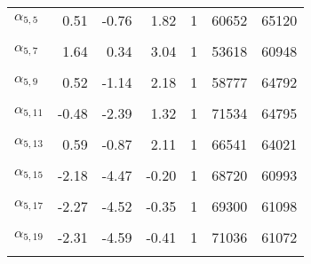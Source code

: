 \begin{longtable}[t]{lrrrrrr}
$\alpha_{5, 5}$ & 0.51 & -0.76 & 1.82 & 1 & 60652 & 65120\\
\cellcolor{gray!6}{$\alpha_{5, 6}$} & \cellcolor{gray!6}{-2.52} & \cellcolor{gray!6}{-4.70} & \cellcolor{gray!6}{-0.68} & \cellcolor{gray!6}{1} & \cellcolor{gray!6}{68789} & \cellcolor{gray!6}{58584}\\
$\alpha_{5, 7}$ & 1.64 & 0.34 & 3.04 & 1 & 53618 & 60948\\
\cellcolor{gray!6}{$\alpha_{5, 8}$} & \cellcolor{gray!6}{1.08} & \cellcolor{gray!6}{-0.16} & \cellcolor{gray!6}{2.37} & \cellcolor{gray!6}{1} & \cellcolor{gray!6}{55457} & \cellcolor{gray!6}{63588}\\
$\alpha_{5, 9}$ & 0.52 & -1.14 & 2.18 & 1 & 58777 & 64792\\
\cellcolor{gray!6}{$\alpha_{5, 10}$} & \cellcolor{gray!6}{1.84} & \cellcolor{gray!6}{-0.36} & \cellcolor{gray!6}{4.29} & \cellcolor{gray!6}{1} & \cellcolor{gray!6}{70521} & \cellcolor{gray!6}{62549}\\
$\alpha_{5, 11}$ & -0.48 & -2.39 & 1.32 & 1 & 71534 & 64795\\
\cellcolor{gray!6}{$\alpha_{5, 12}$} & \cellcolor{gray!6}{1.69} & \cellcolor{gray!6}{0.21} & \cellcolor{gray!6}{3.36} & \cellcolor{gray!6}{1} & \cellcolor{gray!6}{66821} & \cellcolor{gray!6}{60523}\\
$\alpha_{5, 13}$ & 0.59 & -0.87 & 2.11 & 1 & 66541 & 64021\\
\cellcolor{gray!6}{$\alpha_{5, 14}$} & \cellcolor{gray!6}{0.85} & \cellcolor{gray!6}{-0.52} & \cellcolor{gray!6}{2.29} & \cellcolor{gray!6}{1} & \cellcolor{gray!6}{68470} & \cellcolor{gray!6}{63067}\\
$\alpha_{5, 15}$ & -2.18 & -4.47 & -0.20 & 1 & 68720 & 60993\\
\cellcolor{gray!6}{$\alpha_{5, 16}$} & \cellcolor{gray!6}{2.45} & \cellcolor{gray!6}{0.52} & \cellcolor{gray!6}{4.68} & \cellcolor{gray!6}{1} & \cellcolor{gray!6}{65829} & \cellcolor{gray!6}{60004}\\
$\alpha_{5, 17}$ & -2.27 & -4.52 & -0.35 & 1 & 69300 & 61098\\
\cellcolor{gray!6}{$\alpha_{5, 18}$} & \cellcolor{gray!6}{-0.41} & \cellcolor{gray!6}{-1.86} & \cellcolor{gray!6}{0.94} & \cellcolor{gray!6}{1} & \cellcolor{gray!6}{71733} & \cellcolor{gray!6}{65435}\\
$\alpha_{5, 19}$ & -2.31 & -4.59 & -0.41 & 1 & 71036 & 61072\\
\cellcolor{gray!6}{$\alpha_{5, 20}$} & \cellcolor{gray!6}{0.25} & \cellcolor{gray!6}{-1.11} & \cellcolor{gray!6}{1.61} & \cellcolor{gray!6}{1} & \cellcolor{gray!6}{68222} & \cellcolor{gray!6}{64969}\\

\end{longtable}

